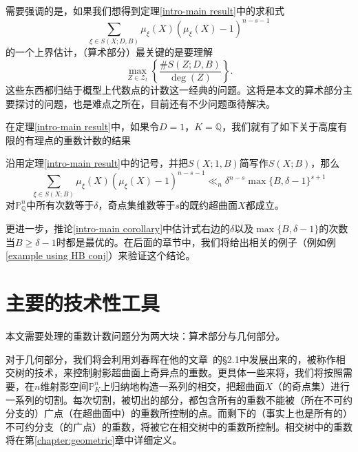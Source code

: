 需要强调的是，如果我们想得到定理\ref{intro-main result}中的求和式
\begin{equation}
\sum\limits_{\xi\in S(X;D,B)} \mu_{\xi}(X)(\mu_{\xi}(X)-1)^{n-s-1}
\end{equation}
的一个上界估计，（算术部分）最关键的是要理解
\begin{equation}
\max\limits_{Z\in\mathcal Z_t}\left\{\frac{\#S(Z;D,B)}{\deg(Z)}\right\}.
\end{equation}
这些东西都归结于概型上代数点的计数这一经典的问题。这将是本文的算术部分主要探讨的问题，也是难点之所在，目前还有不少问题亟待解决。

在定理\ref{intro-main result}中，如果令$D = 1$，$K = \mathbb{Q}$，我们就有了如下关于高度有限的有理点的重数计数的结果

\begin{corollary}
\label{intro-main corollary}
沿用定理\ref{intro-main result}中的记号，并把$S(X;1,B)$简写作$S(X;B)$，那么
\begin{equation}
\sum_{\xi\in S(X;B)} \mu_{\xi}(X)(\mu_{\xi}(X)-1)^{n-s-1}\ll_{n}\delta^{n-s}\max\{B,\delta-1\}^{s+1}
\end{equation}
对$\mathbb{P}_{\mathbb{Q}}^n$中所有次数等于$\delta$，奇点集维数等于$s$的既约超曲面$X$都成立。
\end{corollary}

更进一步，推论\ref{intro-main corollary}中估计式右边的$\delta$以及$\max\{B,\delta-1\}$的次数当$B\geqslant \delta-1$时都是最优的。在后面的章节中，我们将给出相关的例子（例如例\ref{example using HB conj}）来验证这个结论。


\section{主要的技术性工具}
本文需要处理的重数计数问题分为两大块：算术部分与几何部分。

对于几何部分，我们将会利用刘春晖在他的文章~的\S 2.1中发展出来的，被称作相交树的技术，来控制射影超曲面上奇异点的重数。更具体一些来将，我们将按照需要，在$n$维射影空间$\mathbb{P}^n_K$上归纳地构造一系列的相交，把超曲面$X$（的奇点集）进行一系列的切割。每次切割，被切出的部分，都包含所有的重数不能被（所在不可约分支的）广点（在超曲面中）的重数所控制的点。而剩下的（事实上也是所有的）不可约分支（的广点）的重数，将被它在相交树中的重数所控制。相交树中的重数将在第\ref{chapter:geometric}章中详细定义。

